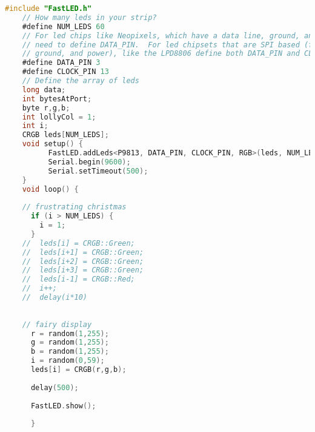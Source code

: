 \begin{lstlisting}[language=C, caption=Arduino code that randomaly changes the clour of each RGB.  label=list:arduinoCode2]
    #include "FastLED.h"
    // How many leds in your strip?
    #define NUM_LEDS 60
    // For led chips like Neopixels, which have a data line, ground, and power, you just
    // need to define DATA_PIN.  For led chipsets that are SPI based (four wires - data, clock,
    // ground, and power), like the LPD8806 define both DATA_PIN and CLOCK_PIN
    #define DATA_PIN 3
    #define CLOCK_PIN 13
    // Define the array of leds
    long data;
    int bytesAtPort;
    byte r,g,b;
    int lollyCol = 1;
    int i;
    CRGB leds[NUM_LEDS];
    void setup() { 
          FastLED.addLeds<P9813, DATA_PIN, CLOCK_PIN, RGB>(leds, NUM_LEDS);
          Serial.begin(9600);
          Serial.setTimeout(500);
    }
    void loop() { 
      
    // frustrating christmas
      if (i > NUM_LEDS) {
        i = 1;
      }
    //  leds[i] = CRGB::Green;
    //  leds[i+1] = CRGB::Green;
    //  leds[i+2] = CRGB::Green;
    //  leds[i+3] = CRGB::Green;
    //  leds[i-1] = CRGB::Red;
    //  i++;
    //  delay(i*10)
    
      
    // fairy display
      r = random(1,255);
      g = random(1,255);
      b = random(1,255);
      i = random(0,59);
      leds[i] = CRGB(r,g,b);
    
      delay(500);
      
      FastLED.show();
      
      }
    
\end{lstlisting}